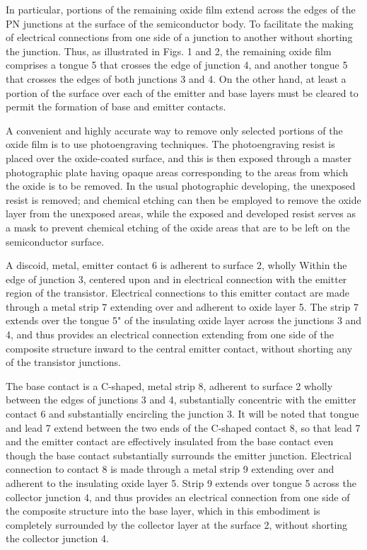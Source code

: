 In particular, portions of the remaining oxide film extend across the edges of the PN junctions at the surface of the semiconductor body. To facilitate the making of electrical connections from one side of a junction to another without shorting the junction. Thus, as illustrated in Figs. 1 and 2, the remaining oxide film comprises a tongue 5 that crosses the edge of junction 4, and another tongue 5 that crosses the edges of both junctions 3 and 4. On the other hand, at least a portion of the surface over each of the emitter and base layers must be cleared to permit the formation of base and emitter contacts.

A convenient and highly accurate way to remove only selected portions of the oxide film is to use photoengraving techniques. The photoengraving resist is placed over the oxide-coated surface, and this is then exposed through a master photographic plate having opaque areas corresponding to the areas from which the oxide is to be removed. In the usual photographic developing, the unexposed resist is removed; and chemical etching can then be employed to remove the oxide layer from the unexposed areas, while the exposed and developed resist serves as a mask to prevent chemical etching of the oxide areas that are to be left on the semiconductor surface.

A discoid, metal, emitter contact 6 is adherent to surface 2, wholly Within the edge of junction 3, centered upon and in electrical connection with the emitter region of the transistor. Electrical connections to this emitter contact are made through a metal strip 7 extending over and adherent to oxide layer 5. The strip 7 extends over the tongue 5" of the insulating oxide layer across the junctions 3 and 4, and thus provides an electrical connection extending from one side of the composite structure inward to the central emitter contact, without shorting any of the transistor junctions.

The base contact is a C-shaped, metal strip 8, adherent to surface 2 wholly between the edges of junctions 3 and 4, substantially concentric with the emitter contact 6 and substantially encircling the junction 3. It will be noted that tongue and lead 7 extend between the two ends of the C-shaped contact 8, so that lead 7 and the emitter contact are effectively insulated from the base contact even though the base contact substantially surrounds the emitter junction. Electrical connection to contact 8 is made through a metal strip 9 extending over and adherent to the insulating oxide layer 5. Strip 9 extends over tongue 5 across the collector junction 4, and thus provides an electrical connection from one side of the composite structure into the base layer, which in this embodiment is completely surrounded by the collector layer at the surface 2, without shorting the collector junction 4.

